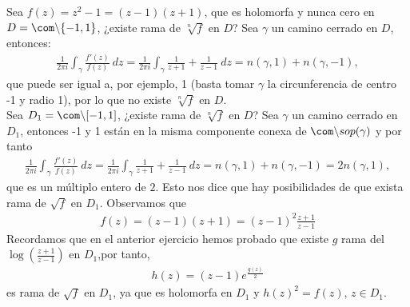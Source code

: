 \begin{ejemplo}
Sea $f(z) = z^2 -1 = (z-1)(z+1)$, que es holomorfa y nunca cero en $D = \com \backslash \{-1,1\}$, ¿existe rama de $\sqrt[n]{f}$ en $D$? Sea $\gamma$ un camino cerrado en $D$, entonces:
\begin{align*}
    \frac{1}{2\pi i} \int_{\gamma} \frac{f'(z)}{f(z)} \ dz = \frac{1}{2\pi i} \int_{\gamma} \frac{1}{z+1} + \frac{1}{z-1} \ dz = n(\gamma,1) + n(\gamma,-1),
\end{align*}
que puede ser igual a, por ejemplo, 1 (basta tomar $\gamma$ la circunferencia de centro -1 y radio 1), por lo que no existe $\sqrt[n]{f}$ en $D$.
\\
\newline
Sea $D_1 = \com \backslash [-1,1]$, ¿existe rama de $\sqrt[n]{f}$ en $D$? Sea $\gamma$ un camino cerrado en $D_1$, entonces -1 y 1 están en la misma componente conexa de $\com \backslash sop(\gamma)$ y por tanto
\begin{align*}
    \frac{1}{2\pi i} \int_{\gamma} \frac{f'(z)}{f(z)} \ dz = \frac{1}{2\pi i} \int_{\gamma} \frac{1}{z+1} + \frac{1}{z-1} \ dz = n(\gamma,1) + n(\gamma,-1) = 2n(\gamma,1),
\end{align*}
que es un múltiplo entero de $2$. Esto nos dice que hay posibilidades de que exista rama de $\sqrt{f}$ en $D_1$. Observamos que
\begin{align*}
    f(z) = (z-1)(z+1) = (z-1)^2\frac{z+1}{z-1}
\end{align*}
Recordamos que en el anterior ejercicio hemos probado que existe $g$ rama del $\log\left( \frac{z+1}{z-1} \right)$ en $D_1$,por tanto, 
\begin{align*}
    h(z) = (z-1)e^{\frac{g(z)}{2}}
\end{align*}
es rama de $\sqrt{f}$ en $D_1$, ya que es holomorfa en $D_1$ y $h(z)^2 = f(z)$, $z \in D_1$.
\end{ejemplo}